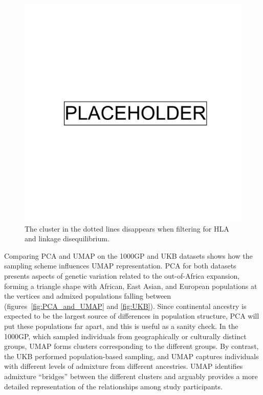 \clearpage

\begin{figure}[ht]
  \centering
        \includegraphics[width=0.8\linewidth]{placeholder.png}
  \caption[UMAP with and without HLA regions filtered]{ The cluster in the dotted lines disappears when filtering for HLA and linkage disequilibrium.}
  \label{fig:HLA}
\end{figure}

\clearpage

Comparing PCA and UMAP on the 1000GP and UKB datasets shows how the sampling scheme influences UMAP representation. PCA for both datasets presents aspects of genetic variation related to the out-of-Africa expansion, forming a triangle shape with African, East Asian, and European populations at the vertices and admixed populations falling between (figures~\ref{fig:PCA_and_UMAP} and \ref{fig:UKB}). Since continental ancestry is expected to be the largest source of differences in population structure, PCA will put these populations far apart, and this is useful as a sanity check. In the 1000GP, which sampled individuals from geographically or culturally distinct groups, UMAP forms clusters corresponding to the different groups. By contrast, the UKB performed population-based sampling, and UMAP captures individuals with different levels of admixture from different ancestries. UMAP identifies admixture ``bridges'' between the different clusters and arguably provides a more detailed representation of the relationships among study participants. 

